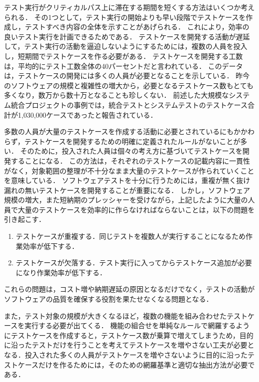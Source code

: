 テスト実行がクリティカルパス上に滞在する期間を短くする方法はいくつか考えられる．
その1つとして，テスト実行の開始よりも早い段階でテストケースを作成し，テストすべき内容の全体を示すことがあげられる．
これにより，効率の良いテスト実行を計画できるためである．
テストケースを開発する活動が遅延して，テスト実行の活動を逼迫しないようにするためには，複数の人員を投入し，短期間でテストケースを作る必要がある．
テストケースを開発する工数は，平均的にテスト工数全体の40パーセントだと言われている\cite{van2013tpi}．
このデータは，テストケースの開発には多くの人員が必要となることを示している．
昨今のソフトウェアの規模と複雑性の増大から，必要となるテストケース数もとても多くなり，数万から数十万となることも珍しくない．
前述した大規模なシステム統合プロジェクトの事例では，統合テストとシステムテストのテストケース合計が1,030,000ケースであったと報告されている．

多数の人員が大量のテストケースを作成する活動に必要とされているにもかかわらず，テストケースを開発するための明確に定義されたルールがないことが多い．
そのために，投入された人員は個々の考え方に基づいてテストケースを開発することになる．
この方法は，それぞれのテストケースの記載内容に一貫性がなく，対象範囲の整理が不十分なまま大量のテストケースが作られていくことを意味している．
ソフトウェアテストを十分に行うためには，重複が無く抜け漏れの無いテストケースを開発することが重要になる．
しかし，ソフトウェア規模の増大，また短納期のプレッシャーを受けながら，上記したように大量の人員で大量のテストケースを効率的に作らなければならないことは，以下の問題を引き起こす．
\begin{enumerate}
\item テストケースが重複する．同じテストを複数人が実行することになるため作業効率が低下する．
\item テストケースが欠落する．テスト実行に入ってからテストケース追加が必要になり作業効率が低下する．
\end{enumerate}

これらの問題は，コスト増や納期遅延の原因となるだけでなく，テストの活動がソフトウェアの品質を確保する役割を果たせなくなる問題となる\cite{mantyla2013more}\cite{mantyla2014time}．

また，テスト対象の規模が大きくなるほど，複数の機能を組み合わせたテストケースを実行する必要が出てくる．
機能の組合せを単純なルールで網羅するようにテストケースを作成すると，テストケース数が乗算で増えてしまうため，目的に沿ったテストだけを行うことを考えてテストケースを増やさない工夫が必要となる．投入された多くの人員がテストケースを増やさないように目的に沿ったテストケースだけを作るためには，そのための網羅基準と適切な抽出方法が必要である．

